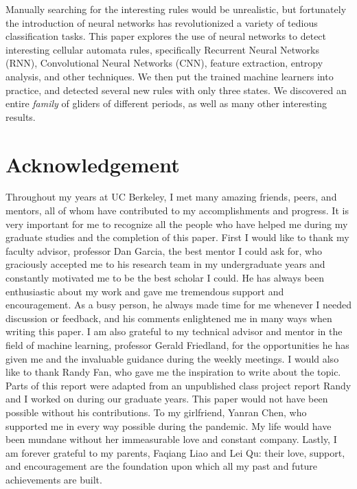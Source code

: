 \documentclass[12pt]{article}
\numberwithin{figure}{section} %
\begin{document}
Manually searching for the interesting rules would be unrealistic, but fortunately the introduction of neural networks has revolutionized a variety of tedious classification tasks. This paper explores the use of neural networks to detect interesting cellular automata rules, specifically Recurrent Neural Networks (RNN), Convolutional Neural Networks (CNN), feature extraction, entropy analysis, and other techniques. We then put the trained machine learners into practice, and detected several new rules with only three states. We discovered an entire \textit{family} of gliders of different periods, as well as many other interesting results. 

\newpage
\thispagestyle{plain}
\section*{\centering Acknowledgement}

Throughout my years at UC Berkeley, I met many amazing friends, peers, and mentors, all of whom have contributed to my accomplishments and progress. It is very important for me to recognize all the people who have helped me during my graduate studies and the completion of this paper. First I would like to thank my faculty advisor, professor Dan Garcia, the best mentor I could ask for, who graciously accepted me to his research team in my undergraduate years and constantly motivated me to be the best scholar I could. He has always been enthusiastic about my work and gave me tremendous support and encouragement. As a busy person, he always made time for me whenever I needed discussion or feedback, and his comments enlightened me in many ways when writing this paper. I am also grateful to my technical advisor and mentor in the field of machine learning, professor Gerald Friedland, for the opportunities he has given me and the invaluable guidance during the weekly meetings. I would also like to thank Randy Fan, who gave me the inspiration to write about the topic. Parts of this report were adapted from an unpublished class project report Randy and I worked on during our graduate years. This paper would not have been possible without his contributions. To my girlfriend, Yanran Chen, who supported me in every way possible during the pandemic. My life would have been mundane without her immeasurable love and constant company. Lastly, I am forever grateful to my parents, Faqiang Liao and Lei Qu: their love, support, and encouragement are the foundation upon which all my past and future achievements are built. 
\end{document}
